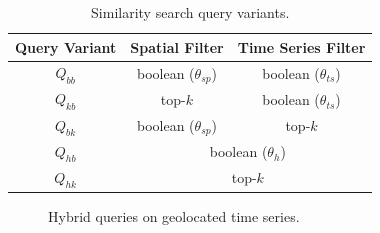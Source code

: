 \begin{table}[!ht]
 \centering
 \caption{Similarity search query variants.}
 \vspace{-10pt}
 \begin{tabular}{c c c}
  \toprule
  Query Variant & Spatial Filter & Time Series Filter \\
  \midrule
  $Q_{bb}$ & boolean ($\theta_{sp}$) & boolean ($\theta_{ts}$) \\
  $Q_{kb}$ & top-$k$ & boolean ($\theta_{ts}$) \\
  $Q_{bk}$ & boolean ($\theta_{sp}$) & top-$k$ \\
  $Q_{hb}$ & \multicolumn{2}{c}{boolean ($\theta_{h}$)} \\
  $Q_{hk}$ & \multicolumn{2}{c}{top-$k$} \\
  \bottomrule
 \end{tabular}
 \label{tab:query_types}
\end{table}

\begin{figure}[!ht]
 \centering
 \qquad
\caption{Hybrid queries on geolocated time series.}
\label{fig:example_queries}
\end{figure}

